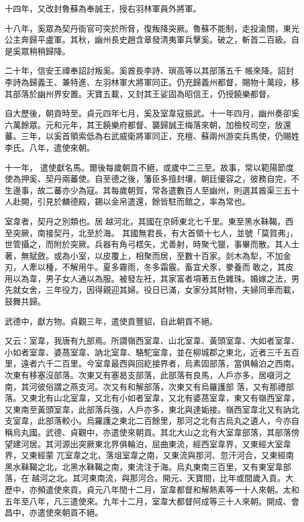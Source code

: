 \begin{pinyinscope}
 十四年，又改封魯蘇為奉誠王，授右羽林軍員外將軍。



 十八年，奚眾為契丹衙官可突於所脅，復叛降突厥。魯蘇不能制，走投渝關，東光公主奔歸平盧軍。其秋，幽州長史趙含章發清夷軍兵擊奚。破之，斬首二百級。自是奚眾稍稍歸降。



 二十年，信安王禕奉詔討叛奚。奚酋長李詩、瑣高等以其部落五千
 帳來降。詔封李詩為歸義王、兼特進、左羽林軍大將軍同正。仍充歸義州都督，賜物十萬段，移其部落於幽州界安置。天寶五載，又封其王娑固為昭信王，仍授饒樂都督。



 自大歷後，朝貢時至。貞元四年七月，奚及室韋寇振武。十一年四月，幽州奏卻奚六萬餘眾。元和元年，其王饒樂府都督、襲歸誠王梅落來朝，加檢校司空，放還蕃。三年，以奚首領索低為右武威衛將軍同正，充檀、蘇兩州游奕兵馬使，仍賜姓李氏。八年，遣使來朝。



 十一年，
 遣使獻名馬。爾後每歲朝貢不絕，或歲中二三至。故事，常以範陽節度使為押奚、契丹兩蕃使。自至德之後，籓臣多擅封壤，朝廷優容之，彼務自完，不生邊事，故二蕃亦少為寇。其每歲朝賀，常各遣數百人至幽州，則選其酋渠三五十人赴闕，引見於麟德殿，錫以金帛遣還，餘皆駐而館之，率為常也。



 室韋者，契丹之別類也。居越河北，其國在京師東北七千里。東至黑水靺鞨，西至突厥，南接契丹，北至於海。
 其國無君長，有大首領十七人，並號「莫賀弗」，世管攝之，而附於突厥。兵器有角弓楛矢，尤善射，時聚弋獵，事畢而散。其人土著，無賦斂。或為小室，以皮覆上，相聚而居，至數十百家。剡木為犁，不加金刃，人牽以種，不解用牛。夏多霧雨，冬多霜霰。畜宜犬豕，豢養而敢之，其皮用以為韋，男子女人通以為服。被發左衽，其家富者項著五色雜珠。婚嫁之法，男先就女舍，三年役力，因得親迎其婦。役日已滿，女家分其財物，夫婦同車而載，鼓舞共歸。



 武德中，獻方物。貞觀三年，遣使貢豐貂，自此朝貢不絕。



 又云：室韋，我唐有九部焉。所謂嶺西室韋、山北室韋、黃頭室韋、大如者室韋、小如者室韋、婆萵室韋、訥北室韋、駱駝室韋，並在柳城郡之東北，近者三千五百里，遠者六千二百里。今室韋最西與回紇接界者，烏素固部落，當俱輪泊之西南。次東有移塞沒部落。次東又有塞曷支部落，此部落有良馬，人戶亦多，居啜河之南，其河彼俗謂之燕支河。次又有和解部落，次東又有烏羅護部
 落，又有那禮部落。又東北有山北室韋，又北有小如者室韋，又北有婆萵室韋，東又有嶺西室韋，又東南至黃頭室韋，此部落兵強，人戶亦多，東北與達姤接。嶺西室韋北又有訥北支室韋，此部落較小。烏羅護之東北二百餘里，那河之北有古烏丸之遺人，今亦自稱烏丸國。武德、貞觀中，亦遣使來朝貢。其北大山之北有大室韋部落，其部落傍望建河居。其河源出突厥東北界俱輪泊，屈曲東流，經西室韋界，又東經大室韋界，又東經蒙
 兀室韋之北，落俎室韋之南，又東流與那河、忽汗河合，又東經南黑水靺鞨之北，北黑水靺鞨之南，東流注于海。烏丸東南三百里，又有東室韋部落，在越河之北。其河東南流，與那河合。開元、天寶間，比年或間歲入貢。大歷中，亦頻遣使來貢。貞元八年閏十二月，室韋都督和解熱素等一十人來朝。太和五年至八年，凡三遣使來。九年十二月，室韋大都督阿成等三十人來朝。開成、會昌中，亦遣使來朝貢不絕。




\end{pinyinscope}
